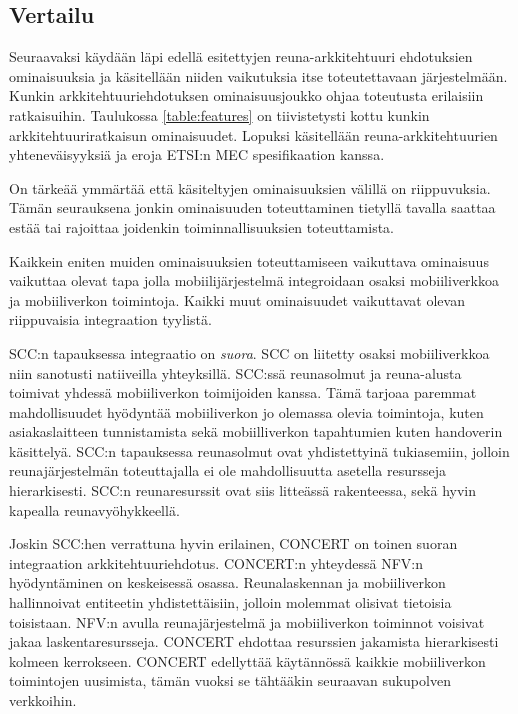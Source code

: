 \subsection{Vertailu}
Seuraavaksi käydään läpi edellä esitettyjen reuna-arkkitehtuuri ehdotuksien ominaisuuksia ja käsitellään niiden vaikutuksia itse toteutettavaan järjestelmään.
Kunkin arkkitehtuuriehdotuksen ominaisuusjoukko ohjaa toteutusta erilaisiin ratkaisuihin. Taulukossa \ref{table:features} on tiivistetysti kottu kunkin arkkitehtuuriratkaisun ominaisuudet.
Lopuksi käsitellään reuna-arkkitehtuurien yhteneväisyyksiä ja eroja ETSI:n MEC spesifikaation kanssa.

On tärkeää ymmärtää että käsiteltyjen ominaisuuksien välillä on riippuvuksia. Tämän seurauksena jonkin ominaisuuden toteuttaminen tietyllä tavalla saattaa estää tai rajoittaa joidenkin toiminnallisuuksien toteuttamista. 

Kaikkein eniten muiden ominaisuuksien toteuttamiseen vaikuttava ominaisuus vaikuttaa olevat tapa jolla mobiilijärjestelmä integroidaan osaksi mobiiliverkkoa ja mobiiliverkon toimintoja.
Kaikki muut ominaisuudet vaikuttavat olevan riippuvaisia integraation tyylistä. 

SCC:n tapauksessa integraatio on \textit{suora}. SCC on liitetty osaksi mobiiliverkkoa niin sanotusti natiiveilla yhteyksillä. SCC:ssä reunasolmut ja reuna-alusta toimivat yhdessä mobiiliverkon toimijoiden kanssa.
Tämä tarjoaa paremmat mahdollisuudet hyödyntää mobiiliverkon jo olemassa olevia toimintoja, kuten asiakaslaitteen tunnistamista sekä mobiilliverkon tapahtumien kuten handoverin käsittelyä. 
SCC:n tapauksessa reunasolmut ovat yhdistettyinä tukiasemiin, jolloin reunajärjestelmän toteuttajalla ei ole mahdollisuutta asetella resursseja hierarkisesti. SCC:n reunaresurssit ovat siis litteässä rakenteessa, sekä hyvin kapealla reunavyöhykkeellä.

Joskin SCC:hen verrattuna hyvin erilainen, CONCERT on toinen suoran integraation arkkitehtuuriehdotus.
CONCERT:n yhteydessä NFV:n hyödyntäminen on keskeisessä osassa.
Reunalaskennan ja mobiiliverkon hallinnoivat entiteetin yhdistettäisiin, jolloin molemmat olisivat tietoisia toisistaan.
NFV:n avulla reunajärjestelmä ja mobiiliverkon toiminnot voisivat jakaa laskentaresursseja. CONCERT ehdottaa resurssien jakamista hierarkisesti kolmeen kerrokseen.
CONCERT edellyttää käytännössä kaikkie mobiiliverkon toimintojen uusimista, tämän vuoksi se tähtääkin seuraavan sukupolven verkkoihin.

